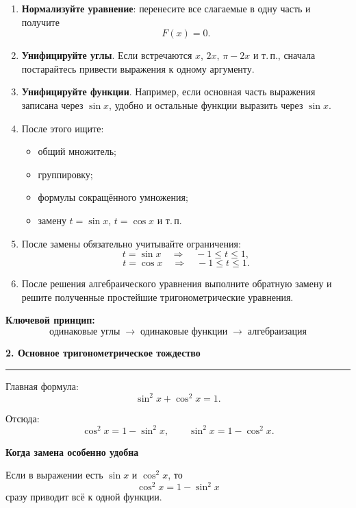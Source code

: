 \documentclass[a4paper,12pt]{article}
\newcommand{\checktitle}[1]{%
    \vspace{0.4em}
    {\Large\bfseries\textcolor{darkaccent}{#1}}\par
    \vspace{0.25em}
    {\color{accent!55}\rule{\linewidth}{0.6pt}}
    \vspace{0.45em}
}
\newcommand{\subcheck}[1]{%
    \vspace{0.25em}
    {\large\bfseries\textcolor{accent}{#1}}\par
    \vspace{0.15em}
}
\newcommand{\important}[1]{\textbf{\textcolor{darkaccent}{#1}}}
\begin{document}
\begin{enumerate}
    \item \important{Нормализуйте уравнение}: перенесите все слагаемые в одну часть и получите
    \[
        F(x)=0.
    \]

    \item \important{Унифицируйте углы}. Если встречаются \(x\), \(2x\), \(\pi-2x\) и т.\,п., сначала постарайтесь привести выражения к одному аргументу.

    \item \important{Унифицируйте функции}. Например, если основная часть выражения записана через \(\sin x\), удобно и остальные функции выразить через \(\sin x\).

    \item После этого ищите:
    \begin{itemize}
        \item общий множитель;
        \item группировку;
        \item формулы сокращённого умножения;
        \item замену \(t=\sin x\), \(t=\cos x\) и т.\,п.
    \end{itemize}

    \item После замены обязательно учитывайте ограничения:
    \[
        t=\sin x \quad\Longrightarrow\quad -1\le t\le1,
    \]
    \[
        t=\cos x \quad\Longrightarrow\quad -1\le t\le1.
    \]

    \item После решения алгебраического уравнения выполните обратную замену и решите полученные простейшие тригонометрические уравнения.
\end{enumerate}

\important{Ключевой принцип:}
\[
\boxed{
\text{одинаковые углы}
\;\longrightarrow\;
\text{одинаковые функции}
\;\longrightarrow\;
\text{алгебраизация}
}
\]


\checktitle{2. Основное тригонометрическое тождество}

Главная формула:
\[
    \sin^2 x+\cos^2 x=1.
\]

Отсюда:
\[
    \cos^2x=1-\sin^2x,
    \qquad
    \sin^2x=1-\cos^2x.
\]

\subcheck{Когда замена особенно удобна}

Если в выражении есть \(\sin x\) и \(\cos^2x\), то
\[
    \cos^2x=1-\sin^2x
\]
сразу приводит всё к одной функции.
\end{document}
